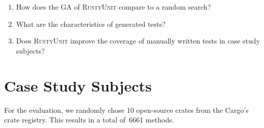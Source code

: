 \documentclass[paper=a4,%
  twoside,%
  BCOR4mm,%
  abstract=true,%
  toc=bibliography,%
  chapterprefix=true,%
  toc=bibliographynumbered,%
  open=right,%
  english,%
  pagesize=pdftex]{scrreprt}
\newcommand{\benchnum}{10\xspace}
\newcommand{\methodsnum}{6661\xspace}
\newcommand{\tech}{\textsc{RustyUnit}\xspace}
\begin{document}
\begin{enumerate}[start=1, label={\bfseries RQ\arabic*:}]
    \item How does the \ac{GA} of \tech compare to a random search?
    \item What are the characteristics of generated tests? 
    
    \item Does \tech improve the coverage of manually written tests in case study subjects?
\end{enumerate} 

\section{Case Study Subjects}
\label{sec:case-study-subjects}
For the evaluation, we randomly chose \benchnum open-source crates from the Cargo's crate registry. This results in a total of~\methodsnum methods.
\end{document}

